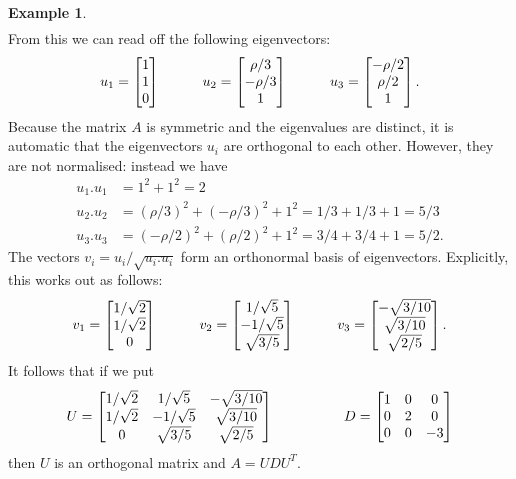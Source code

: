 \documentclass[reqno]{amsart}
\theoremstyle{definition}
\newtheorem{example}[theorem]{Example}
\begin{document}
\begin{example}
\begin{align*}
 \end{align*}
 From this we can read off the following eigenvectors:
 \[
    u_1 = \left[\begin{matrix} 1\\1\\0\end{matrix}\right] \hspace{3em}
    u_2 = \left[\begin{matrix} \rho/3 \\ -\rho/3\\ 1\end{matrix}\right] \hspace{3em}
    u_3 = \left[\begin{matrix} -\rho/2\\ \rho/2 \\ 1 \end{matrix}\right]. 
 \]
 Because the matrix $A$ is symmetric and the eigenvalues are distinct,
 it is automatic that the eigenvectors $u_i$ are orthogonal to each
 other.  However, they are not normalised: instead we have
 \begin{align*}
    u_1.u_1 &= 1^2+1^2 = 2 \\
    u_2.u_2 &= (\rho/3)^2 + (-\rho/3)^2 + 1^2 
             = 1/3 + 1/3 + 1 = 5/3 \\
    u_3.u_3 &= (-\rho/2)^2 + (\rho/2)^2 + 1^2
             = 3/4 + 3/4 + 1 = 5/2.
 \end{align*}
 The vectors $v_i=u_i/\sqrt{u_i.u_i}$ form an orthonormal basis of
 eigenvectors.  Explicitly, this works out as follows:
 \[ 
   v_1 = \left[\begin{matrix} 1/\sqrt{2} \\ 1/\sqrt{2} \\ 0 \end{matrix}\right]
   \hspace{3em}
   v_2 = \left[\begin{matrix} 1/\sqrt{5} \\ -1/\sqrt{5} \\ \sqrt{3/5} \end{matrix}\right]
   \hspace{3em}
   v_3 = \left[\begin{matrix} -\sqrt{3/10} \\ \sqrt{3/10} \\ \sqrt{2/5} \end{matrix}\right].
 \]
 It follows that if we put 
 \[ 
  U = \left[\begin{matrix} 
       1/\sqrt{2} &  1/\sqrt{5} & -\sqrt{3/10} \\
       1/\sqrt{2} & -1/\sqrt{5} &  \sqrt{3/10} \\
       0          &  \sqrt{3/5} &  \sqrt{2/5} 
      \end{matrix}\right]
  \hspace{5em}
  D = \left[\begin{matrix} 
       1 & 0 & 0 \\ 0 & 2 & 0 \\ 0 & 0 & -3 
      \end{matrix}\right]
 \]
 then $U$ is an orthogonal matrix and $A=UDU^T$.
\end{example}
\end{document}
